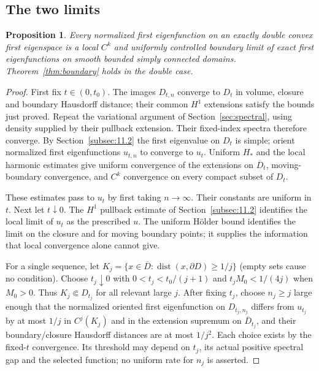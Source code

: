 \documentclass[11pt]{article}
\newtheorem{proposition}[theorem]{Proposition}
\theoremstyle{definition}
\theoremstyle{remark}
\numberwithin{equation}{section}
\begin{document}
\subsection{The two limits}\label{subsec:11.4}
\begin{proposition}\label{prop:double-limits}
Every normalized first eigenfunction on an exactly double convex first eigenspace is a local $C^k$ and uniformly controlled boundary limit of exact first eigenfunctions on smooth bounded simply connected domains. Theorem~\ref{thm:boundary} holds in the double case.
\end{proposition}
\begin{proof}

First fix $t\in(0,t_0)$. The images $D_{t,n}$ converge to $D_t$ in volume, closure and boundary Hausdorff distance; their common $H^1$ extensions satisfy the bounds just proved. Repeat the variational argument of Section~\ref{sec:spectral}, using density supplied by their pullback extension. Their fixed-index spectra therefore converge. By Section~\ref{subsec:11.2} the first eigenvalue on $D_t$ is simple; orient normalized first eigenfunctions $u_{t,n}$ to converge to $u_t$. Uniform $H_*$ and the local harmonic estimates give uniform convergence of the extensions on $\overline D_t$, moving-boundary convergence, and $C^k$ convergence on every compact subset of $D_t$.

These estimates pass to $u_t$ by first taking $n\to\infty$. Their constants are uniform in $t$. Next let $t\downarrow0$. The $H^1$ pullback estimate of Section~\ref{subsec:11.2} identifies the local limit of $u_t$ as the prescribed $u$. The uniform H\"older bound identifies the limit on the closure and for moving boundary points; it supplies the information that local convergence alone cannot give.

For a single sequence, let $K_j=\{x\in\overline D:\operatorname{dist}(x,\partial D)\ge1/j\}$ (empty sets cause no condition). Choose $t_j\downarrow0$ with $0<t_j<t_0/(j+1)$ and $t_jM_0<1/(4j)$ when $M_0>0$. Thus $K_j\Subset D_{t_j}$ for all relevant large $j$. After fixing $t_j$, choose $n_j\ge j$ large enough that the normalized oriented first eigenfunction on $D_{t_j,n_j}$ differs from $u_{t_j}$ by at most $1/j$ in $C^j(K_j)$ and in the extension supremum on $\overline D_{t_j}$, and their boundary/closure Hausdorff distances are at most $1/j^2$. Each choice exists by the fixed-$t$ convergence. Its threshold may depend on $t_j$, its actual positive spectral gap and the selected function; no uniform rate for $n_j$ is asserted.


\end{proof}
\end{document}
